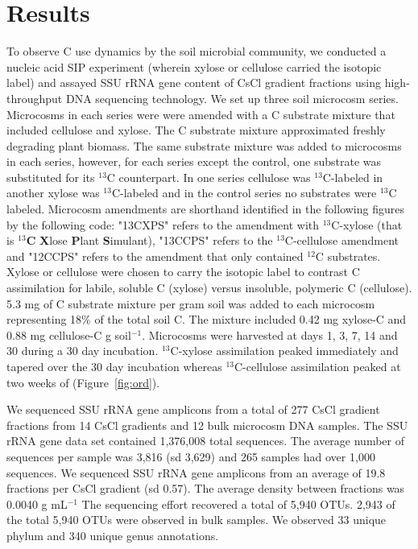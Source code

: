 \section{Results}
To observe C use dynamics by the soil microbial community, we conducted a
nucleic acid SIP experiment (wherein xylose or cellulose carried the isotopic
label) and assayed SSU rRNA gene content of CsCl gradient fractions using
high-throughput DNA sequencing technology. We set up three soil microcosm
series.  Microcosms in each series were were amended with a C substrate mixture
that included cellulose and xylose. The C substrate mixture approximated
freshly degrading plant biomass. The same substrate mixture was added to
microcosms in each series, however, for each series except the control, one
substrate was substituted for its $^{13}$C counterpart. In one series cellulose
was $^{13}$C-labeled in another xylose was $^{13}$C-labeled and in the control
series no substrates were $^{13}$C labeled. Microcosm amendments are shorthand
identified in the following figures by the following code: "13CXPS" refers to
the amendment with $^{13}$C-xylose (that is $^{13}$\textbf{C} \textbf{X}lose
\textbf{P}lant \textbf{S}imulant), "13CCPS" refers to the $^{13}$C-cellulose
amendment and "12CCPS" refers to the amendment that only contained $^{12}$C
substrates. Xylose or cellulose were chosen to carry the isotopic label to
contrast C assimilation for labile, soluble C (xylose) versus insoluble,
polymeric C (cellulose).  5.3 mg of C substrate mixture per gram soil was added
to each microcosm representing 18\% of the total soil C. The mixture included
0.42 mg xylose-C and 0.88 mg cellulose-C g soil$^{-1}$.  Microcosms were
harvested at days 1, 3, 7, 14 and 30  during a 30 day incubation.
$^{13}$C-xylose assimilation peaked immediately and tapered over the 30 day
incubation whereas $^{13}$C-cellulose assimilation peaked at two weeks of
(Figure~\ref{fig:ord}).

We sequenced SSU rRNA gene amplicons from a total of 277 CsCl gradient
fractions from 14 CsCl gradients and 12 bulk microcosm DNA samples. The SSU
rRNA gene data set contained 1,376,008 total sequences. The average number of
sequences per sample was 3,816 (sd 3,629) and 265 samples had over 1,000
sequences. We sequenced SSU rRNA gene amplicons from an average of 19.8
fractions per CsCl gradient (sd 0.57). The average density between fractions
was  0.0040 g mL$^{-1}$ The sequencing effort recovered a total of 5,940 OTUs.
2,943 of the total 5,940 OTUs were observed in bulk samples. We observed 33
unique phylum and 340 unique genus annotations.

